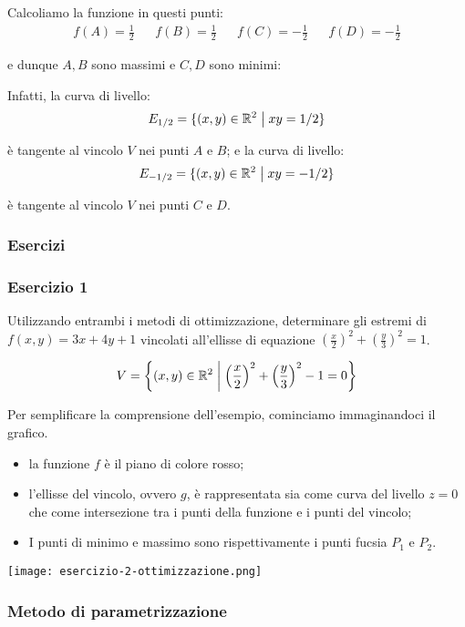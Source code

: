Calcoliamo la funzione in questi punti:
\medskip
\begin{align*}
    f(A) = \frac{1}{2} &  & f(B) = \frac{1}{2} &  & f(C) = -\frac{1}{2} &  & f(D) = - \frac{1}{2}
\end{align*}

e dunque \(A,B\) sono massimi e \(C,D\) sono minimi:

Infatti, la curva di livello:
\[
    E_{ 1/2} = \{(x,y) \in \R^{2} \giventhat xy = 1/2\}
\]

è tangente al vincolo \(V\) nei punti \(A\) e \(B\); e la curva di livello:
\[
    E_{ -1/2} = \{(x,y) \in \R^{2} \giventhat xy = -1/2\}
\]

è tangente al vincolo \(V\) nei punti \(C\) e \(D\).

\pagebreak
\subsubsection{Esercizi}

\subsubsection*{Esercizio 1}

Utilizzando entrambi i metodi di ottimizzazione, determinare gli estremi di \(f(x,y) = 3x + 4y +1\) vincolati all'ellisse di equazione \({\left(\frac{x}{2}\right)}^{2}+ {\left(\frac{y}{3}\right)}^{2}=1\).

\[
    V = \left\{(x,y) \in \R^{2} \giventhat[\bigg] {\left(\frac{x}{2}\right)}^{2}+ {\left(\frac{y}{3}\right)}^{2}-1=0\right\}
\]

Per semplificare la comprensione dell'esempio, cominciamo immaginandoci il grafico.
\begin{itemize}
    \item la funzione \(f\) è il piano di colore rosso;
    \item l'ellisse del vincolo, ovvero \(g\), è rappresentata sia come curva del livello \(z=0\) che come intersezione tra i punti della funzione e i punti del vincolo;
    \item I punti di minimo e massimo sono rispettivamente i punti fucsia \(P_1\) e \(P_2\).
\end{itemize}
\begin{center}
    \texttt{[image: esercizio-2-ottimizzazione.png]}
\end{center}

\filbreak{}
\subsubsection*{Metodo di parametrizzazione}

